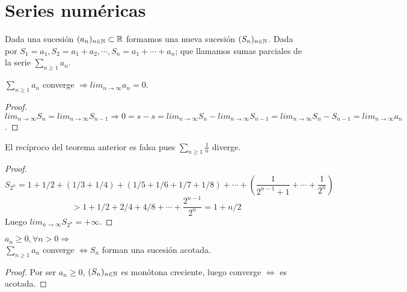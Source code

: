 \section{Series numéricas}

Dada una sucesión $(a_n)_{n \in \mathbb{N}} \subset \mathbb{R}$ formamos una nueva sucesión $(S_n)_{n \in \mathbb{N}}$. Dada por $S_1 = a_1, S_2 = a_1 + a_2, \cdots, S_n = a_1 + \cdots + a_n$; que llamamos sumas parciales de la serie $\sum_{n \geq 1} a_n$.


\begin{theorem}
  $\sum_{n \geq 1} a_n$ converge $\Rightarrow lim_{n \to \infty} a_n = 0$.
  \begin{proof}
    $lim_{n \to \infty} S_n = lim_{n \to \infty} S_{n-1} \Rightarrow 0 = s - s = lim_{n \to \infty} S_n - lim_{n \to \infty} S_{n-1} = lim_{n \to \infty} S_n - S_{n-1} = lim_{n \to \infty} a_n$.
  \end{proof}
\end{theorem}

\begin{eg}
  El recíproco del teorema anterior es falsa pues $\sum_{n \geq 1} \frac{1}{n}$ diverge.
  \begin{proof}
    \begin{equation}
      S_{2^n} = 1 + 1/2 + (1/3 + 1/4) + (1/5 + 1/6 + 1/7 + 1/8) + \cdots + (\frac{1}{2^{n-1}+1} + \cdots + \frac{1}{2^n})
    \end{equation}
    \begin{equation}
      > 1 + 1/2 + 2/4 + 4/8 + \cdots + \frac{2^{n-1}}{2^n} = 1 + n/2
    \end{equation}
    Luego $lim_{n \to \infty} S_{2^n} = + \infty$.
  \end{proof}
\end{eg}

\begin{theorem}
  $a_n \geq 0, \forall n > 0 \Rightarrow$ \\
  $\sum_{n \geq 1} a_n$ converge $\iff S_n$ forman una sucesión acotada.
  \begin{proof}
    Por ser $a_n \geq 0$, $(S_n)_{n \in \mathbb{N}}$ es monótona creciente, luego converge $\iff$ es acotada.
  \end{proof}
\end{theorem}

